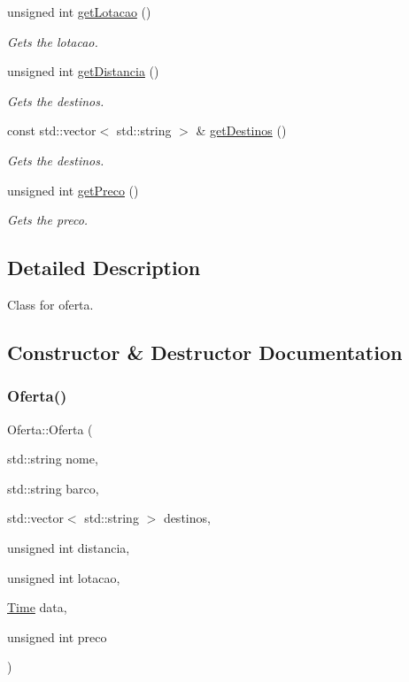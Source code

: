 \begin{DoxyCompactItemize}
unsigned int \hyperlink{classOferta_a9c8fbec401e54e590828209931bf25b0}{get\+Lotacao} ()
\begin{DoxyCompactList}\small\item\em Gets the lotacao. \end{DoxyCompactList}\item 
unsigned int \hyperlink{classOferta_a0d07f80f25f4fb21c0819c3e25d67fb9}{get\+Distancia} ()
\begin{DoxyCompactList}\small\item\em Gets the destinos. \end{DoxyCompactList}\item 
const std\+::vector$<$ std\+::string $>$ \& \hyperlink{classOferta_a746c91e5db19098d211a3f6bde2ec8ec}{get\+Destinos} ()
\begin{DoxyCompactList}\small\item\em Gets the destinos. \end{DoxyCompactList}\item 
unsigned int \hyperlink{classOferta_a6237afc2e8a33fb55b1ef0decf9d9aaa}{get\+Preco} ()
\begin{DoxyCompactList}\small\item\em Gets the preco. \end{DoxyCompactList}\end{DoxyCompactItemize}


\subsection{Detailed Description}
Class for oferta. 

\subsection{Constructor \& Destructor Documentation}
\mbox{\label{classOferta_a49a53f9d6ba51f97a3b428c8fac98d7f}} 
\subsubsection{\texorpdfstring{Oferta()}{Oferta()}}
{\footnotesize\ttfamily Oferta\+::\+Oferta (\begin{DoxyParamCaption}\item[{std\+::string}]{nome,  }\item[{std\+::string}]{barco,  }\item[{std\+::vector$<$ std\+::string $>$}]{destinos,  }\item[{unsigned int}]{distancia,  }\item[{unsigned int}]{lotacao,  }\item[{\hyperlink{classTime}{Time}}]{data,  }\item[{unsigned int}]{preco }\end{DoxyParamCaption})}



